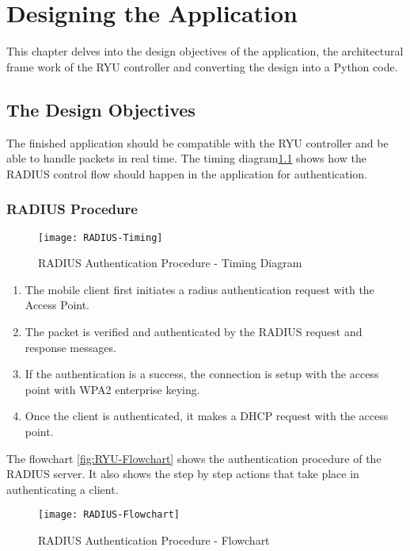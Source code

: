 \chapter{Designing the Application}\label{ch:application_design}
This chapter delves into the design objectives of the application, the architectural frame work of the RYU controller and converting the design into a Python code.

\section{The Design Objectives}

The finished application should be compatible with the RYU controller and be able to handle packets in real time. The timing diagram\ref{fig:Radius-Timing} shows how the RADIUS control flow should happen in the application for authentication.

\subsection{RADIUS Procedure} \label{RADIUS_Procedure}

\begin{figure}
	\centering
	\texttt{[image: RADIUS-Timing]}
	\caption {RADIUS Authentication Procedure - Timing Diagram }
	\label{fig:Radius-Timing}
	\vspace{-10pt}
\end{figure}

\begin{enumerate}
	\item The mobile client first initiates a radius authentication request with the Access Point.
	\item The packet is verified and authenticated by the RADIUS request and response messages.
	\item If the authentication is a success, the connection is setup with the access point with WPA2 enterprise keying.
	\item Once the client is authenticated, it makes a DHCP request with the access point.   
	
\end{enumerate}
The flowchart \ref{fig:RYU-Flowchart} shows the authentication procedure of the RADIUS server. It also shows the step by step actions that take place in authenticating a client.
\begin{figure}
	\centering
	\texttt{[image: RADIUS-Flowchart]}
	\caption {RADIUS Authentication Procedure - Flowchart }
	\label{fig:Radius-Flowchart}
	\vspace{-10pt}
\end{figure}
